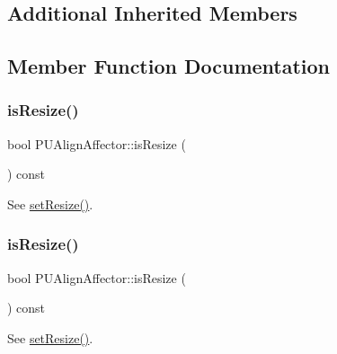 \subsection*{Additional Inherited Members}


\subsection{Member Function Documentation}
\mbox{\label{classPUAlignAffector_a34c0edf97481efd6f99104721ca111df}} 
\subsubsection{\texorpdfstring{is\+Resize()}{isResize()}\hspace{0.1cm}{\footnotesize\ttfamily [1/2]}}
{\footnotesize\ttfamily bool P\+U\+Align\+Affector\+::is\+Resize (\begin{DoxyParamCaption}{ }\end{DoxyParamCaption}) const}

See \hyperlink{classPUAlignAffector_a217e42a696450708afac9f4ba0473181}{set\+Resize()}. \mbox{\label{classPUAlignAffector_a34c0edf97481efd6f99104721ca111df}} 
\subsubsection{\texorpdfstring{is\+Resize()}{isResize()}\hspace{0.1cm}{\footnotesize\ttfamily [2/2]}}
{\footnotesize\ttfamily bool P\+U\+Align\+Affector\+::is\+Resize (\begin{DoxyParamCaption}{ }\end{DoxyParamCaption}) const}

See \hyperlink{classPUAlignAffector_a217e42a696450708afac9f4ba0473181}{set\+Resize()}. \mbox{\label{classPUAlignAffector_a217e42a696450708afac9f4ba0473181}} 
